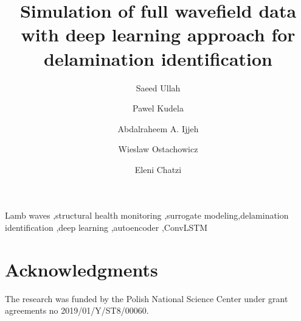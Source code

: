 \documentclass[preprint,9pt]{elsarticle}
\begin{document}
	\begin{frontmatter}
		\title{Simulation of full wavefield data with deep learning approach for delamination identification}
		
		\address[IFFM]{Institute of Fluid Flow Machinery, Polish Academy of 
		Sciences, Poland}
		\address[ETH]{Department of Civil, Environmental, and Geomatic Engineering, ETH Z\"{u}rich, Switzerland}
		\author{Saeed Ullah}
		\author{Pawel Kudela}
		\author{Abdalraheem A. Ijjeh}
		\author{Wieslaw Ostachowicz }
		\author{Eleni Chatzi }	
		
		\begin{abstract}
			
		\end{abstract}
		
		\begin{keyword}
			Lamb waves \sep structural health monitoring \sep surrogate 
			modeling\sep delamination identification \sep deep learning 
			\sep  autoencoder \sep ConvLSTM 
			
			
		\end{keyword}
	\end{frontmatter}
	
	
	
	
	
	\clearpage
	
	
	\clearpage	
	\section*{Acknowledgments}
	The research was funded by the Polish National Science Center under grant agreements no 2019/01/Y/ST8/00060.
	
	
\end{document}
